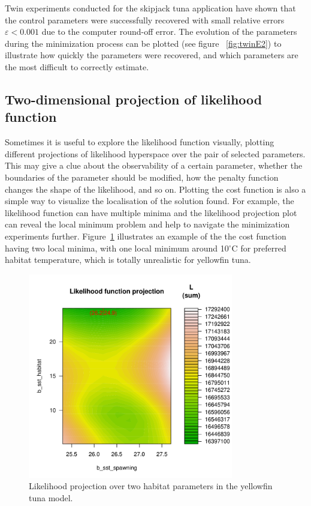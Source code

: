 Twin experiments conducted for the skipjack tuna application \citep{Senina08} have shown that the control parameters were successfully recovered with small relative errors $\varepsilon< 0.001$ due to the computer round-off error. The evolution of the parameters during the minimization process can be plotted (see figure ~\ref{fig:twinE2}) to illustrate how quickly the parameters were recovered, and which parameters are the most difficult to correctly estimate. \\

\subsection{Two-dimensional projection of likelihood function}\label{sec:like-profiling}

Sometimes it is useful to explore the likelihood function visually, plotting different projections of likelihood hyperspace over the pair of selected parameters. This may give a clue about the observability of a certain parameter, whether the boundaries of the parameter should be modified, how the penalty function changes the shape of the likelihood, and so on. Plotting the cost function is also a simple way to visualize the localisation of the solution found. For example, the likelihood function can have multiple minima and the likelihood projection plot can reveal the local minimum problem and help to navigate the minimization experiments further. Figure~\ref{fig:hyperplot1} illustrates an example of the the cost function having two local minima, with one local minimum around 10$^\circ$C for preferred habitat temperature, which is totally unrealistic for yellowfin tuna. 

\begin{figure}[H]
	\centering
		\includegraphics[width=0.8\textwidth]{chapter4/figs/Fig_hyperplot_yft_2mins}
	\caption{Likelihood projection over two habitat parameters in the yellowfin tuna model.}
	\label{fig:hyperplot1}
\end{figure}

